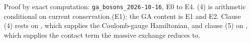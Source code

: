 Proof by exact computation: \texttt{ga\_bosons\_2026-10-16}, E0 to E4. (4) is arithmetic conditional on current conservation (E1); the GA content is E1 and E2. Clause (4) rests on , which supplies the Coulomb-gauge Hamiltonian, and clause (5) on , which supplies the contact term the massive exchange reduces to.
